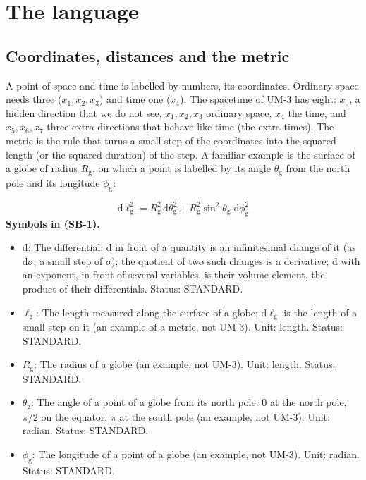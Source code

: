 \documentclass[
  10pt,
]{article}
\providecommand{\tightlist}{%
  \setlength{\itemsep}{0pt}\setlength{\parskip}{0pt}}
\begin{document}
\hypertarget{the-language}{%
\section{The language}\label{the-language}}

\hypertarget{coordinates-distances-and-the-metric}{%
\subsection{Coordinates, distances and the
metric}\label{coordinates-distances-and-the-metric}}

A point of space and time is labelled by numbers, its coordinates.
Ordinary space needs three (\(x_1, x_2, x_3\)) and time one (\(x_4\)).
The spacetime of UM-3 has eight: \(x_0\), a hidden direction that we do
not see, \(x_1, x_2, x_3\) ordinary space, \(x_4\) the time, and
\(x_5, x_6, x_7\) three extra directions that behave like time (the
extra times). The metric is the rule that turns a small step of the
coordinates into the squared length (or the squared duration) of the
step. A familiar example is the surface of a globe of radius
\(R_{\mathrm{g}}\), on which a point is labelled by its angle
\(\theta_{\mathrm{g}}\) from the north pole and its longitude
\(\phi_{\mathrm{g}}\):

\[
\mathrm{d}\ell_{\mathrm{g}}^2 = R_{\mathrm{g}}^2\,\mathrm{d}\theta_{\mathrm{g}}^2 + R_{\mathrm{g}}^2\sin^2\theta_{\mathrm{g}}\;\mathrm{d}\phi_{\mathrm{g}}^2 \tag{SB-1}
\] \textbf{Symbols in (SB-1).}

\begin{itemize}
\tightlist
\item
  \(\mathrm{d}\): The differential: \(\mathrm{d}\) in front of a
  quantity is an infinitesimal change of it (as \(\mathrm{d}\sigma\), a
  small step of \(\sigma\)); the quotient of two such changes is a
  derivative; \(\mathrm{d}\) with an exponent, in front of several
  variables, is their volume element, the product of their
  differentials. Status: STANDARD.
\item
  \(\ell_{\mathrm{g}}\): The length measured along the surface of a
  globe; \(\mathrm{d}\ell_{\mathrm{g}}\) is the length of a small step
  on it (an example of a metric, not UM-3). Unit: length. Status:
  STANDARD.
\item
  \(R_{\mathrm{g}}\): The radius of a globe (an example, not UM-3).
  Unit: length. Status: STANDARD.
\item
  \(\theta_{\mathrm{g}}\): The angle of a point of a globe from its
  north pole: 0 at the north pole, \(\pi/2\) on the equator, \(\pi\) at
  the south pole (an example, not UM-3). Unit: radian. Status: STANDARD.
\item
  \(\phi_{\mathrm{g}}\): The longitude of a point of a globe (an
  example, not UM-3). Unit: radian. Status: STANDARD.
\end{itemize}
\end{document}
